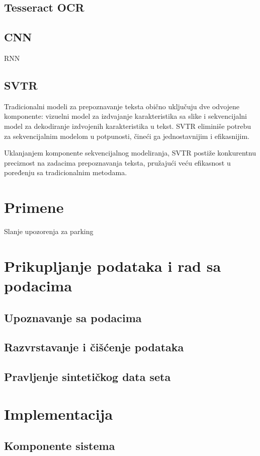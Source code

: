 \documentclass[a4paper,12pt,titlepage]{article}
\begin{document}
	\subsection{Tesseract OCR}
	\subsection{CNN}
	RNN
	\subsection{SVTR}
	Tradicionalni modeli za prepoznavanje teksta obično uključuju dve odvojene komponente: vizuelni model za izdvajanje karakteristika sa slike i sekvencijalni model za dekodiranje izdvojenih karakteristika u tekst. SVTR eliminiše potrebu za sekvencijalnim modelom u potpunosti, čineći ga jednostavnijim i efikasnijim.
	
	Uklanjanjem komponente sekvencijalnog modeliranja, SVTR postiže konkurentnu preciznost na zadacima prepoznavanja teksta, pružajući veću efikasnost u poređenju sa tradicionalnim metodama.
	
	\newpage
	
	\section{Primene}
	Slanje upozorenja za parking
	\newpage
	
	\section{Prikupljanje podataka i rad sa podacima}
	\subsection{Upoznavanje sa podacima}
	\subsection{Razvrstavanje i čišćenje podataka}
	\subsection{Pravljenje sintetičkog data seta}
	\newpage
	
	\section{Implementacija}
	\subsection{Komponente sistema}
\end{document}
